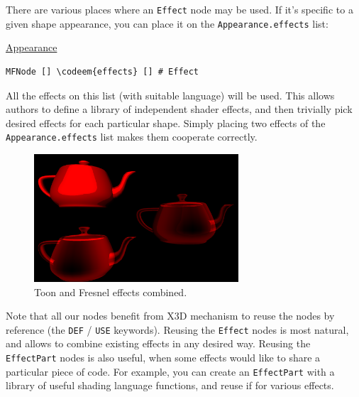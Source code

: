 \documentclass{egpubl}
\newenvironment{mycode}
{\begin{mycodecore}}
{\end{mycodecore}
\vspace{-0.1in}}
\newcommand*{\codeem}[1]{\textbf{#1}}
\begin{document}
There are various places where an \texttt{Effect} node may be used.
If it's specific to a given shape appearance, you can place it
on the \texttt{Appearance.effects} list:

\begin{mycode}
\underline{Appearance}
\begin{Verbatim}[commandchars=\\\{\},fontsize=\small]
MFNode [] \codeem{effects} [] # Effect
\end{Verbatim}
\end{mycode}

All the effects on this list (with suitable language) will be used.
This allows authors to define a library of independent shader effects,
and then trivially pick desired effects for each particular shape.
Simply placing two effects of the \texttt{Appearance.effects} list
makes them cooperate correctly.

\begin{figure}[H]
  \centering
  \includegraphics[width=3in]{fresnel_and_toon}
  \caption{Toon and Fresnel effects combined.}
\end{figure}

Note that all our nodes benefit from X3D mechanism to reuse the nodes
by reference (the \texttt{DEF} / \texttt{USE} keywords). Reusing the
\texttt{Effect} nodes
is most natural, and allows to combine existing effects in any desired way.
Reusing the \texttt{EffectPart} nodes is also useful, when some effects
would like to share a particular piece of code. For example,
you can create an \texttt{EffectPart} with a library of useful
shading language functions, and reuse if for various effects.
\end{document}
